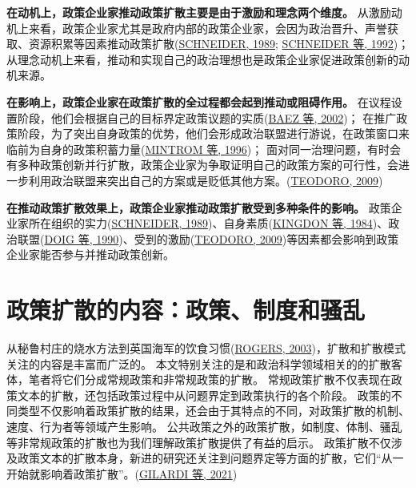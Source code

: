 \documentclass[
  12pt,
]{ctexart}
\begin{document}
\textbf{在动机上，政策企业家推动政策扩散主要是由于激励和理念两个维度。}
从激励动机上来看，政策企业家尤其是政府内部的政策企业家，会因为政治晋升、声誉获取、资源积累等因素推动政策扩散(\protect\hyperlink{ref-Schneider1989}{SCHNEIDER, 1989}; \protect\hyperlink{ref-SchneiderTeske1992}{SCHNEIDER 等, 1992})；
从理念动机上来看，推动和实现自己的政治理想也是政策企业家促进政策创新的动机来源。

\textbf{在影响上，政策企业家在政策扩散的全过程都会起到推动或阻碍作用。}
在议程设置阶段，他们会根据自己的目标界定政策议题的实质(\protect\hyperlink{ref-BaezAbolafia2002}{BAEZ 等, 2002})；
在推广政策阶段，为了突出自身政策的优势，他们会形成政治联盟进行游说，在政策窗口来临前为自身的政策积蓄力量(\protect\hyperlink{ref-MintromVergari1996}{MINTROM 等, 1996})；
面对同一治理问题，有时会有多种政策创新并行扩散，政策企业家为争取证明自己的政策方案的可行性，会进一步利用政治联盟来突出自己的方案或是贬低其他方案。(\protect\hyperlink{ref-Teodoro2009}{TEODORO, 2009})

\textbf{在推动政策扩散效果上，政策企业家推动政策扩散受到多种条件的影响。}
政策企业家所在组织的实力(\protect\hyperlink{ref-Schneider1989}{SCHNEIDER, 1989})、自身素质(\protect\hyperlink{ref-KingdonStano1984a}{KINGDON 等, 1984})、政治联盟(\protect\hyperlink{ref-DoigHargrove1990}{DOIG 等, 1990})、受到的激励(\protect\hyperlink{ref-Teodoro2009}{TEODORO, 2009})等因素都会影响到政策企业家能否参与并推动政策创新。

\newpage

\hypertarget{ux653fux7b56ux6269ux6563ux7684ux5185ux5bb9ux653fux7b56ux5236ux5ea6ux548cux9a9aux4e71}{%
\section{政策扩散的内容：政策、制度和骚乱}\label{ux653fux7b56ux6269ux6563ux7684ux5185ux5bb9ux653fux7b56ux5236ux5ea6ux548cux9a9aux4e71}}

从秘鲁村庄的烧水方法到英国海军的饮食习惯(\protect\hyperlink{ref-Rogers2003}{ROGERS, 2003})，扩散和扩散模式关注的内容是丰富而广泛的。
本文特别关注的是和政治科学领域相关的的扩散客体，笔者将它们分成常规政策和非常规政策的扩散。
常规政策扩散不仅表现在政策文本的扩散，还包括政策过程中从问题界定到政策执行的各个阶段。
政策的不同类型不仅影响着政策扩散的结果，还会由于其特点的不同，对政策扩散的机制、速度、行为者等领域产生影响。
公共政策之外的政策扩散，如制度、体制、骚乱等非常规政策的扩散也为我们理解政策扩散提供了有益的启示。
政策扩散不仅涉及政策文本的扩散本身，新进的研究还关注到问题界定等方面的扩散，它们``从一开始就影响着政策扩散''。(\protect\hyperlink{ref-GilardiEtAl2021}{GILARDI 等, 2021})
\end{document}
